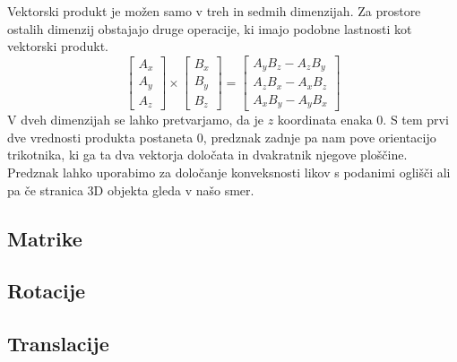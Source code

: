 \documentclass[a4paper, 12px]{article}
\begin{document}
    Vektorski produkt je možen samo v treh in sedmih dimenzijah. Za prostore ostalih dimenzij obstajajo
    druge operacije, ki imajo podobne lastnosti kot vektorski produkt.
    $$\begin{bmatrix}
        A_x \\ A_y \\ A_z
    \end{bmatrix} \times \begin{bmatrix}
        B_x \\ B_y \\ B_z
    \end{bmatrix} = \begin{bmatrix}
        A_y B_z - A_z B_y \\ A_z B_x - A_x B_z \\ A_x B_y - A_y B_x
    \end{bmatrix}$$
    V dveh dimenzijah se lahko pretvarjamo, da je $z$ koordinata enaka $0$. S tem prvi dve vrednosti
    produkta postaneta $0$, predznak zadnje pa nam pove orientacijo trikotnika, ki ga ta dva vektorja 
    določata in dvakratnik njegove ploščine. Predznak lahko uporabimo za določanje konveksnosti likov
    s podanimi oglišči ali pa če stranica 3D objekta gleda v našo smer.
\subsection{Matrike}
\subsection{Rotacije}
\subsection{Translacije}

\printbibliography
\end{document}
